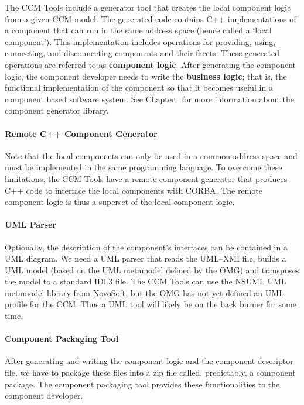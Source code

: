 The CCM Tools include a generator tool that creates the local component logic
from a given CCM model. The generated code contains C++ implementations of a
component that can run in the same address space (hence called a `local
component'). This implementation includes operations for providing, using,
connecting, and disconnecting components and their facets. These generated
operations are referred to as {\bf component logic}. After generating the
component logic, the component developer needs to write the {\bf business
logic}; that is, the functional implementation of the component so that it
becomes useful in a component based software system. See
Chapter~\cite{chapter:component-generator-tools} for more information about the
component generator library.

\paragraph{Remote C++ Component Generator}

Note that the local components can only be used in a common address space and
must be implemented in the same programming language. To overcome these
limitations, the CCM Tools have a remote component generator that produces C++
code to interface the local components with CORBA. The remote component logic is
thus a superset of the local component logic.

\paragraph{UML Parser}

Optionally, the description of the component's interfaces can be contained in a
UML diagram. We need a UML parser that reads the UML--XMI file, builds a UML
model (based on the UML metamodel defined by the OMG) and transposes the model
to a standard IDL3 file. The CCM Tools can use the NSUML UML metamodel library
from NovoSoft, but the OMG has not yet defined an UML profile for the CCM. Thus
a UML tool will likely be on the back burner for some time.

\paragraph{Component Packaging Tool}

After generating and writing the component logic and the component descriptor
file, we have to package these files into a zip file called, predictably, a
component package. The component packaging tool provides these functionalities
to the component developer.


